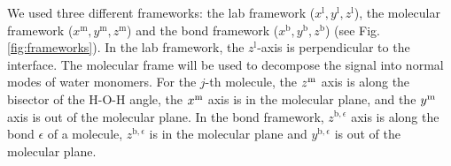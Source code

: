 We used three different frameworks: the lab framework ($x^{\text{l}},y^{\text{l}},z^{\text{l}}$), the molecular framework
($x^{\text{m}},y^{\text{m}},z^{\text{m}}$) and the bond framework ($x^{\text{b}},y^{\text{b}},z^{\text{b}}$) (see Fig.\thinspace\ref{fig:frameworks}).
In the lab framework, the $z^{\text{l}}$-axis is perpendicular to the interface.
The molecular frame will be used to decompose the signal into normal modes of water monomers.
For the $j$-th molecule, the $z^{\text m}$ axis is along the bisector of the H-O-H angle, the $x^{\text m}$ axis is in the molecular plane,
and the $y^{\text m}$ axis is out of the molecular plane. 
In the bond framework, $z^{\text{b},\epsilon}$ axis is along the bond $\epsilon$ of a molecule, $z^{\text{b},\epsilon}$
is in the molecular plane and $y^{\text{b},\epsilon}$ is out of the molecular plane.

